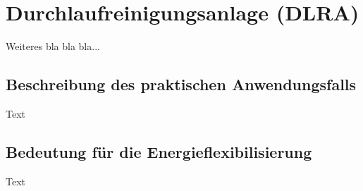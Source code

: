 \section{Durchlaufreinigungsanlage (DLRA)}
\label{ch_04Durchlaufreinigungsanlage (DLRA)}
Weiteres bla bla bla...

\subsection{Beschreibung des praktischen Anwendungsfalls}
\label{ch_04Beschreibung des praktischen Anwendungsfalls}
Text

\subsection{Bedeutung für die Energieflexibilisierung}
\label{ch_04Bedeutung für die Energieflexibilisierung}
Text